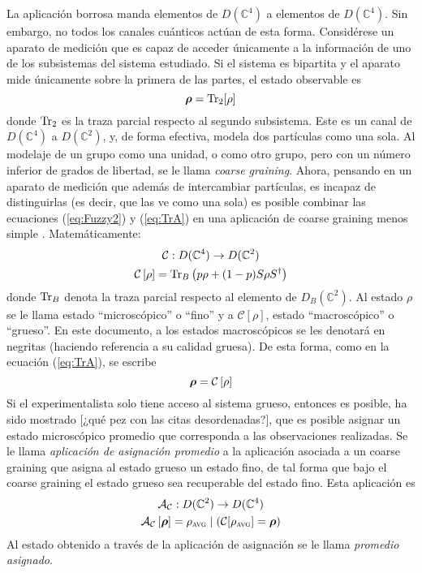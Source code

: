 \documentclass[onecolumn,11pt]{article}
\newcommand{\mcA}{\mathcal{A}}
\newcommand{\Cc}{\mathcal{C}} %
\newcommand{\Hh}{\mathbb{C}} %
\newcommand{\CG}[1]{\Cc\left[#1\right]}
\newcommand*{\B}[1]{\ifmmode\bm{#1}\else\textbf{#1}\fi}
\newcommand{\notaAd}[1]{{\color{blue} [#1]}} %
\begin{document}
La aplicación borrosa manda elementos de $D(\Hh^{4})$ a elementos de $D(\Hh^{4})$. Sin embargo, no todos los canales cuánticos actúan de esta forma. Considérese un aparato de medición que es capaz de acceder únicamente a la información de uno de los subsistemas del sistema estudiado. Si el sistema es bipartita y el aparato mide únicamente sobre la primera de las partes, el estado observable es
\begin{equation}\label{eq:TrA}
\B{\rho}=\Tr_{2}[\rho]
\end{equation}
donde $\Tr_{2}$ es la traza parcial respecto al segundo subsistema. Este es un canal de $D(\Hh^{4})$ a $D(\Hh^{2})$, y, de forma efectiva, modela dos partículas como una sola. Al modelaje de un grupo como una unidad, o como otro grupo, pero con un número inferior de grados de libertad, se le llama \textit{coarse graining}. Ahora, pensando en un aparato de medición que además de intercambiar partículas, es incapaz de distinguirlas (es decir, que las ve como una sola) es posible combinar las ecuaciones (\ref{eq:Fuzzy2}) y (\ref{eq:TrA}) en una aplicación de coarse graining menos simple \cite{FuzzyMeasurements}. Matemáticamente:
\begin{gather}
\Cc:D(\Hh^{4})\rightarrow D(\Hh^{2})\label{eq:CGDom}\\
\Cc\left[\rho\right]=\Tr_{B}\left(p\rho+(1-p)S\rho S^{\dag}\right)\label{eq:CG}
\end{gather}
donde $\Tr_{B}$ denota la traza parcial respecto al elemento de $D_{B}(\Hh^{2})$. Al estado $\rho$ se le llama estado ``microscópico'' o ``fino'' y a $\CG{\rho}$, estado ``macroscópico'' o ``grueso''. En este documento, a los estados macroscópicos se les denotará en negritas (haciendo referencia a su calidad gruesa). De esta forma, como en la ecuación (\ref{eq:TrA}), se escribe
\begin{equation}
    \B{\rho}=\CG{\rho}
\end{equation}
Si el experimentalista solo tiene acceso al sistema grueso, entonces es posible, ha sido mostrado \cite{Macro-To-Micro} \notaAd{¿qué pez con las citas desordenadas?}, que es posible asignar un estado microscópico promedio que corresponda a las observaciones realizadas. Se le llama \textit{aplicación de asignación promedio} a la aplicación asociada a un coarse graining que asigna al estado grueso un estado fino, de tal forma que bajo el coarse graining el estado grueso sea recuperable del estado fino. Esta aplicación es
\begin{gather}
\mcA_{\Cc}:D(\Hh^{2})\rightarrow D(\Hh^{4})\label{eq:AAMDom}\\
\mcA_{\Cc}\left[\B{\rho}\right]=\rho_{\textsc{avg}}\mid(\Cc[\rho_{\textsc{avg}}]=\B{\rho})\label{eq:AAM}
\end{gather}
Al estado obtenido a través de la aplicación de asignación se le llama \textit{promedio asignado}.
\end{document}
